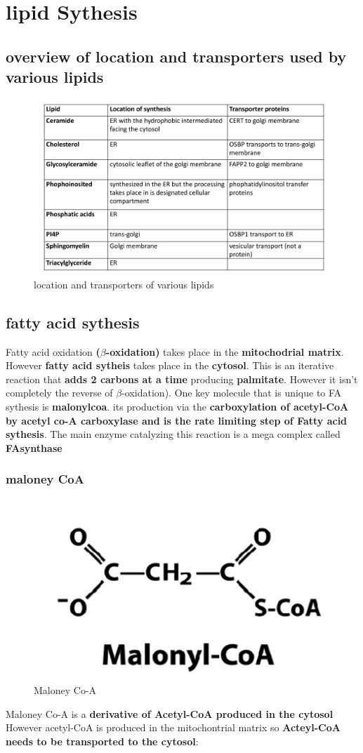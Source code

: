 \documentclass[../main.tex]{subfiles}
\begin{document}
	

\section{lipid Sythesis}
\subsection{overview of location and transporters used by various lipids}
\begin{figure}[H]
    \centering
    \includegraphics[width=\linewidth]{location.png}
    \caption{location and transporters of various lipids}
    \label{fig:enter-label}
\end{figure}
\subsection{fatty acid sythesis}
Fatty acid oxidation \textbf{($\beta$-oxidation)} takes place in the \textbf{mitochodrial matrix}. However \textbf{fatty acid sytheis} takes place in the \textbf{cytosol}. This is an iterative reaction that \textbf{adds 2 carbons at a time} producing  \textbf{palmitate}. However it isn't completely the reverse of $\beta$-oxidation). One key molecule that is unique to FA sythesis is \textbf{\gls{malonylcoa}}. its production via the \textbf{carboxylation of acetyl-CoA by acetyl co-A carboxylase and is the rate limiting step of Fatty acid sythesis}. The main enzyme catalyzing this reaction is a mega complex called \textbf{\gls{FAsynthase}}
\subsubsection{maloney CoA}
\begin{figure}[H]
    \centering
    \includegraphics[width=0.25\linewidth]{Maloney.png}
    \caption{Maloney Co-A}
    \label{fig:enter-label}
\end{figure}
Maloney Co-A is a \textbf{derivative of Acetyl-CoA produced in the cytosol} However acetyl-CoA is produced in the mitochontrial matrix so \textbf{Acteyl-CoA needs to be transported to the cytosol}:
\end{document}
